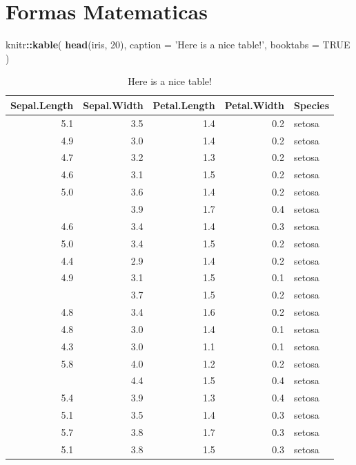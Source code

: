 \documentclass[16pt,]{krantz}
\newenvironment{Shaded}{\begin{snugshade}}{\end{snugshade}}
\newcommand{\DataTypeTok}[1]{\textcolor[rgb]{0.13,0.29,0.53}{#1}}
\newcommand{\DecValTok}[1]{\textcolor[rgb]{0.00,0.00,0.81}{#1}}
\newcommand{\KeywordTok}[1]{\textcolor[rgb]{0.13,0.29,0.53}{\textbf{#1}}}
\newcommand{\NormalTok}[1]{#1}
\newcommand{\OperatorTok}[1]{\textcolor[rgb]{0.81,0.36,0.00}{\textbf{#1}}}
\newcommand{\OtherTok}[1]{\textcolor[rgb]{0.56,0.35,0.01}{#1}}
\newcommand{\StringTok}[1]{\textcolor[rgb]{0.31,0.60,0.02}{#1}}
\theoremstyle{definition}
\theoremstyle{definition}
\theoremstyle{definition}
\theoremstyle{definition}
\theoremstyle{remark}
\begin{document}
\hypertarget{formas-matematicas}{%
\chapter{Formas Matematicas}\label{formas-matematicas}}

\begin{Shaded}
\begin{Highlighting}[]
\NormalTok{knitr}\OperatorTok{::}\KeywordTok{kable}\NormalTok{(}
  \KeywordTok{head}\NormalTok{(iris, }\DecValTok{20}\NormalTok{), }\DataTypeTok{caption =} \StringTok{'Here is a nice table!'}\NormalTok{,}
  \DataTypeTok{booktabs =} \OtherTok{TRUE}
\NormalTok{)}
\end{Highlighting}
\end{Shaded}

\begin{table}

\caption{\label{tab:nice-tab}Here is a nice table!}
\centering
\begin{tabular}[t]{rrrrl}
\toprule
Sepal.Length & Sepal.Width & Petal.Length & Petal.Width & Species\\
\midrule
5.1 & 3.5 & 1.4 & 0.2 & setosa\\
4.9 & 3.0 & 1.4 & 0.2 & setosa\\
4.7 & 3.2 & 1.3 & 0.2 & setosa\\
4.6 & 3.1 & 1.5 & 0.2 & setosa\\
5.0 & 3.6 & 1.4 & 0.2 & setosa\\
\addlinespace
5.4 & 3.9 & 1.7 & 0.4 & setosa\\
4.6 & 3.4 & 1.4 & 0.3 & setosa\\
5.0 & 3.4 & 1.5 & 0.2 & setosa\\
4.4 & 2.9 & 1.4 & 0.2 & setosa\\
4.9 & 3.1 & 1.5 & 0.1 & setosa\\
\addlinespace
5.4 & 3.7 & 1.5 & 0.2 & setosa\\
4.8 & 3.4 & 1.6 & 0.2 & setosa\\
4.8 & 3.0 & 1.4 & 0.1 & setosa\\
4.3 & 3.0 & 1.1 & 0.1 & setosa\\
5.8 & 4.0 & 1.2 & 0.2 & setosa\\
\addlinespace
5.7 & 4.4 & 1.5 & 0.4 & setosa\\
5.4 & 3.9 & 1.3 & 0.4 & setosa\\
5.1 & 3.5 & 1.4 & 0.3 & setosa\\
5.7 & 3.8 & 1.7 & 0.3 & setosa\\
5.1 & 3.8 & 1.5 & 0.3 & setosa\\
\bottomrule
\end{tabular}
\end{table}
\end{document}
